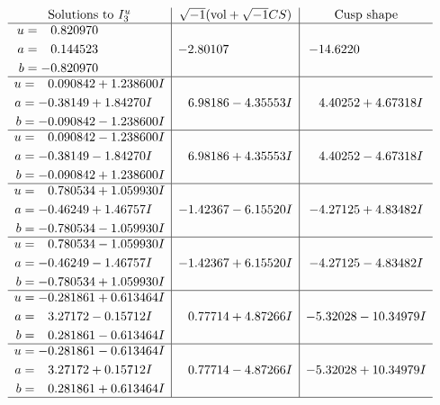 \documentclass[1p]{elsarticle_modified}
\theoremstyle{definition}
\newcommand{\I}{\sqrt{-1}}
\begin{document}
$$\begin{array}{c|c|c}  
\text{Solutions to }I^u_{3}& \I (\text{vol} + \sqrt{-1}CS) & \text{Cusp shape}\\
 \hline 
\begin{aligned}
u &= \phantom{-}0.820970\phantom{ +0.000000I} \\
a &= \phantom{-}0.144523\phantom{ +0.000000I} \\
b &= -0.820970\phantom{ +0.000000I}\end{aligned}
 & -2.80107\phantom{ +0.000000I} & -14.6220\phantom{ +0.000000I} \\ \hline\begin{aligned}
u &= \phantom{-}0.090842 + 1.238600 I \\
a &= -0.38149 + 1.84270 I \\
b &= -0.090842 - 1.238600 I\end{aligned}
 & \phantom{-}6.98186 - 4.35553 I & \phantom{-}4.40252 + 4.67318 I \\ \hline\begin{aligned}
u &= \phantom{-}0.090842 - 1.238600 I \\
a &= -0.38149 - 1.84270 I \\
b &= -0.090842 + 1.238600 I\end{aligned}
 & \phantom{-}6.98186 + 4.35553 I & \phantom{-}4.40252 - 4.67318 I \\ \hline\begin{aligned}
u &= \phantom{-}0.780534 + 1.059930 I \\
a &= -0.46249 + 1.46757 I \\
b &= -0.780534 - 1.059930 I\end{aligned}
 & -1.42367 - 6.15520 I & -4.27125 + 4.83482 I \\ \hline\begin{aligned}
u &= \phantom{-}0.780534 - 1.059930 I \\
a &= -0.46249 - 1.46757 I \\
b &= -0.780534 + 1.059930 I\end{aligned}
 & -1.42367 + 6.15520 I & -4.27125 - 4.83482 I \\ \hline\begin{aligned}
u &= -0.281861 + 0.613464 I \\
a &= \phantom{-}3.27172 - 0.15712 I \\
b &= \phantom{-}0.281861 - 0.613464 I\end{aligned}
 & \phantom{-}0.77714 + 4.87266 I & -5.32028 - 10.34979 I \\ \hline\begin{aligned}
u &= -0.281861 - 0.613464 I \\
a &= \phantom{-}3.27172 + 0.15712 I \\
b &= \phantom{-}0.281861 + 0.613464 I\end{aligned}
 & \phantom{-}0.77714 - 4.87266 I & -5.32028 + 10.34979 I\\
 \hline 
 \end{array}$$\newpage\newpage\renewcommand{\arraystretch}{1}
\end{document}
